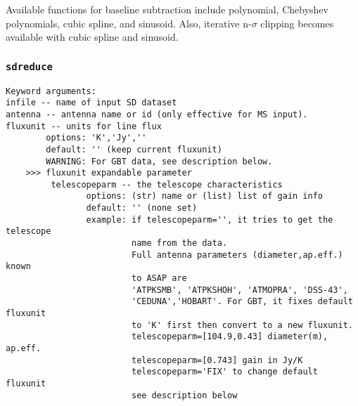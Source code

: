 Available functions for baseline subtraction include polynomial, Chebyshev polynomials, 
cubic spline, and sinusoid. 
Also, iterative n-$\sigma$ clipping becomes available with cubic spline and sinusoid. 


\subsubsection{{\tt sdreduce}}
\label{section:sd.sdtasks.tasks.sdreduce}

\begin{verbatim}
Keyword arguments:
infile -- name of input SD dataset
antenna -- antenna name or id (only effective for MS input). 
fluxunit -- units for line flux
        options: 'K','Jy',''
        default: '' (keep current fluxunit)
        WARNING: For GBT data, see description below.
    >>> fluxunit expandable parameter
         telescopeparm -- the telescope characteristics
                options: (str) name or (list) list of gain info
                default: '' (none set)
                example: if telescopeparm='', it tries to get the telescope
                         name from the data.
                         Full antenna parameters (diameter,ap.eff.) known
                         to ASAP are
                         'ATPKSMB', 'ATPKSHOH', 'ATMOPRA', 'DSS-43',
                         'CEDUNA','HOBART'. For GBT, it fixes default fluxunit
                         to 'K' first then convert to a new fluxunit.
                         telescopeparm=[104.9,0.43] diameter(m), ap.eff.
                         telescopeparm=[0.743] gain in Jy/K
                         telescopeparm='FIX' to change default fluxunit
                         see description below


\end{verbatim}
